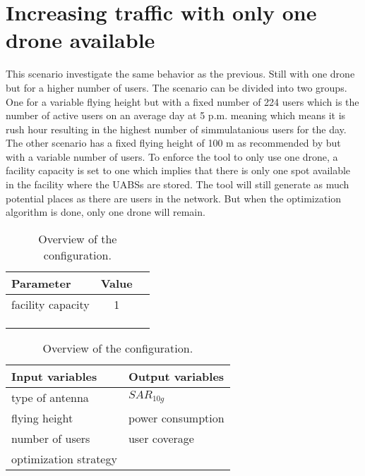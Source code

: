 

\section{Increasing traffic with only one drone available}

This scenario investigate the same behavior  as the previous. Still with one drone but for a higher number of users. The scenario can be divided into two groups. One for a variable 
flying height but with a fixed number of 224 users which is the number of active users on an average day at 5 p.m. meaning
 which means it is rush hour resulting in the highest number of simmulatanious users for the day\cite{J2}. The other 
scenario has a fixed flying height of 100 m as recommended by \cite{J2} but with a variable number of users. To enforce the tool to only use one drone, a facility capacity is set to one 
which implies that there is only one spot available in the facility where the \gls{UABS}s are stored. The tool will still generate as much potential places 
as there are users in the network. But when the optimization algorithm is done, only one drone will remain.

\begin{table}[!htb]
    \begin{minipage}{.5\linewidth}
      \centering
        \begin{tabular}{|l|c|l|}
        \hline
        \textbf{Parameter}              & \textbf{Value}          \\   \hline 
        facility capacity               & 1        \\    
        &  \\ 
        & \\ 
        & \\ 
        \hline
        \end{tabular}
    \end{minipage}%
    \begin{minipage}{.5\linewidth}
      \centering
            \begin{tabular}{|l|l|}
            \hline
            \textbf{Input variables  }              & \textbf{Output variables}          \\   \hline 
            type of antenna                & $SAR_{10g}$               \\ 
            flying height                     & power consumption             \\ 
            number of users                & user coverage            \\
            optimization strategy         &                               \\ 
            \hline
            \end{tabular}
    \end{minipage} 
        \caption{Overview of the configuration.}
        \label{table:confOverviewScenario2}
\end{table}

